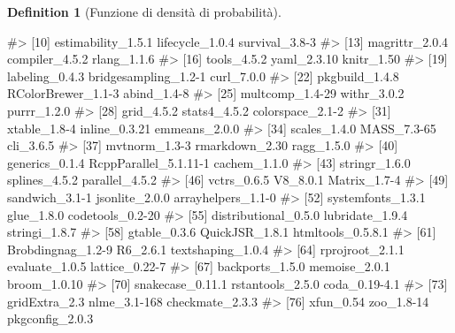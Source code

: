 \documentclass[
  letterpaper,
  DIV=11,
  numbers=noendperiod,
  oneside]{scrreprt}
\newenvironment{Shaded}{\begin{snugshade}}{\end{snugshade}}
\newcommand{\CommentTok}[1]{\textcolor[rgb]{0.37,0.37,0.37}{#1}}
\theoremstyle{definition}
\theoremstyle{plain}
\theoremstyle{definition}
\newtheorem{definition}{Definition}[chapter]
\theoremstyle{remark}
\begin{document}
\begin{definition}[Funzione di densità di
probabilità]
\begin{tcolorbox}
\begin{Shaded}
\begin{Highlighting}[]
\CommentTok{\#\textgreater{} [10] estimability\_1.5.1    lifecycle\_1.0.4       survival\_3.8{-}3       }
\CommentTok{\#\textgreater{} [13] magrittr\_2.0.4        compiler\_4.5.2        rlang\_1.1.6          }
\CommentTok{\#\textgreater{} [16] tools\_4.5.2           yaml\_2.3.10           knitr\_1.50           }
\CommentTok{\#\textgreater{} [19] labeling\_0.4.3        bridgesampling\_1.2{-}1  curl\_7.0.0           }
\CommentTok{\#\textgreater{} [22] pkgbuild\_1.4.8        RColorBrewer\_1.1{-}3    abind\_1.4{-}8          }
\CommentTok{\#\textgreater{} [25] multcomp\_1.4{-}29       withr\_3.0.2           purrr\_1.2.0          }
\CommentTok{\#\textgreater{} [28] grid\_4.5.2            stats4\_4.5.2          colorspace\_2.1{-}2     }
\CommentTok{\#\textgreater{} [31] xtable\_1.8{-}4          inline\_0.3.21         emmeans\_2.0.0        }
\CommentTok{\#\textgreater{} [34] scales\_1.4.0          MASS\_7.3{-}65           cli\_3.6.5            }
\CommentTok{\#\textgreater{} [37] mvtnorm\_1.3{-}3         rmarkdown\_2.30        ragg\_1.5.0           }
\CommentTok{\#\textgreater{} [40] generics\_0.1.4        RcppParallel\_5.1.11{-}1 cachem\_1.1.0         }
\CommentTok{\#\textgreater{} [43] stringr\_1.6.0         splines\_4.5.2         parallel\_4.5.2       }
\CommentTok{\#\textgreater{} [46] vctrs\_0.6.5           V8\_8.0.1              Matrix\_1.7{-}4         }
\CommentTok{\#\textgreater{} [49] sandwich\_3.1{-}1        jsonlite\_2.0.0        arrayhelpers\_1.1{-}0   }
\CommentTok{\#\textgreater{} [52] systemfonts\_1.3.1     glue\_1.8.0            codetools\_0.2{-}20     }
\CommentTok{\#\textgreater{} [55] distributional\_0.5.0  lubridate\_1.9.4       stringi\_1.8.7        }
\CommentTok{\#\textgreater{} [58] gtable\_0.3.6          QuickJSR\_1.8.1        htmltools\_0.5.8.1    }
\CommentTok{\#\textgreater{} [61] Brobdingnag\_1.2{-}9     R6\_2.6.1              textshaping\_1.0.4    }
\CommentTok{\#\textgreater{} [64] rprojroot\_2.1.1       evaluate\_1.0.5        lattice\_0.22{-}7       }
\CommentTok{\#\textgreater{} [67] backports\_1.5.0       memoise\_2.0.1         broom\_1.0.10         }
\CommentTok{\#\textgreater{} [70] snakecase\_0.11.1      rstantools\_2.5.0      coda\_0.19{-}4.1        }
\CommentTok{\#\textgreater{} [73] gridExtra\_2.3         nlme\_3.1{-}168          checkmate\_2.3.3      }
\CommentTok{\#\textgreater{} [76] xfun\_0.54             zoo\_1.8{-}14            pkgconfig\_2.0.3}
\end{Highlighting}
\end{Shaded}

\end{tcolorbox}


\end{definition}
\end{document}
